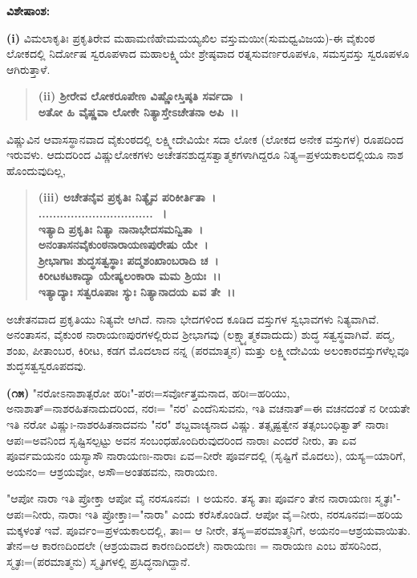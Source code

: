 \noindent
\textbf{ವಿಶೇಷಾಂಶ:\enginline{-}}

\textbf{(i)} ವಿಮಲಾಕೃತಿಃ ಪ್ರಕೃತಿರೇವ ಮಹಾಮಣಿಹೇಮಮಯ್ಯಖಿಲ ವಸ್ತುಮಯೀ\break (ಸುಮಧ್ವವಿಜಯ)-ಈ ವೈಕುಂಠ ಲೋಕದಲ್ಲಿ ನಿರ್ದೋಷ ಸ್ವರೂಪಳಾದ ಮಹಾಲಕ್ಷ್ಮಿಯೇ ಶ್ರೇಷ್ಠವಾದ ರತ್ನಸುವರ್ಣರೂಪಳೂ, ಸಮಸ್ತವಸ್ತು ಸ್ವರೂಪಳೂ ಆಗಿರುತ್ತಾಳೆ.

\begin{verse}
\textbf{(ii) ಶ‍್ರೀರೇವ ಲೋಕರೂಪೇಣ ವಿಷ್ಣೋಸ್ತಿಷ್ಠತಿ ಸರ್ವದಾ~।}\\\textbf{ಅತೋ ಹಿ ವೈಷ್ಣವಾ ಲೋಕೇ ನಿತ್ಯಾಸ್ತೇಽಚೇತನಾ ಅಪಿ~।।}
\end{verse}


ವಿಷ್ಣುವಿನ ಆವಾಸಸ್ಥಾನವಾದ ವೈಕುಂಠದಲ್ಲಿ ಲಕ್ಷ್ಮೀದೇವಿಯೇ ಸದಾ ಲೋಕ (ಲೋಕದ ಅನೇಕ ವಸ್ತುಗಳ) ರೂಪದಿಂದ ಇರುವಳು. ಆದುದರಿಂದ ವಿಷ್ಣುಲೋಕಗಳು ಅಚೇತನಶುದ್ದಸತ್ವಾತ್ಮಕಗಳಾಗಿದ್ದರೂ ನಿತ್ಯ=ಪ್ರಳಯಕಾಲದಲ್ಲಿಯೂ ನಾಶ ಹೊಂದುವುದಿಲ್ಲ,

\begin{verse}
\textbf{(iii) ಅಚೇತನೈವ ಪ್ರಕೃತಿಃ ನಿತ್ಯೈವ ಪರಿಕೀರ್ತಿತಾ~।}\\\textbf{................................~।}\\\textbf{ಇತ್ಯಾದಿ ಪ್ರಕೃತಿಃ ನಿತ್ಯಾ ನಾನಾಭೇದಸಮನ್ವಿತಾ~।}\\\textbf{ಅನಂತಾಸನವೈಕುಂಠನಾರಾಯಣಪುರೇಷು ಯೇ~।}\\\textbf{ಶ‍್ರೀಭಾಗಾಃ ಶುದ್ಧಸತ್ವಸ್ಥಾಃ ಪದ್ಮಶಂಖಾಂಬರಾದಿ ಚ~।}\\\textbf{ಕಿರೀಟಕಟಕಾದ್ಯಾ ಯೇಷ್ಯಲಂಕಾರಾ ಮಮ ಶ್ರಿಯಃ~।।}\\\textbf{ಇತ್ಯಾದ್ಯಾಃ ಸತ್ವರೂಪಾಃ ಸ್ಯುಃ ನಿತ್ಯಾನಾದಯ ಏವ ತೇ~।।}
\end{verse}


\noindent
ಅಚೇತನವಾದ ಪ್ರಕೃತಿಯು ನಿತ್ಯವೇ ಆಗಿದೆ. ನಾನಾ ಭೇದಗಳಿಂದ ಕೂಡಿದ ವಸ್ತುಗಳ ಸ್ವಭಾವಗಳು ನಿತ್ಯವಾಗಿವೆ. ಅನಂತಾಸನ, ವೈಕುಂಠ ನಾರಾಯಣಪುರಗಳಲ್ಲಿರುವ ಶ‍್ರೀಭಾಗವು (ಲಕ್ಷ್ಮ್ಯಾತ್ಮಕವಾದುದು) ಶುದ್ಧ ಸತ್ವಸ್ಥವಾಗಿವೆ. ಪದ್ಮ, ಶಂಖ, ಪೀತಾಂಬರ, ಕಿರೀಟ, ಕಡಗ ಮೊದಲಾದ ನನ್ನ (ಪರಮಾತ್ಮನ) ಮತ್ತು ಲಕ್ಷ್ಮೀದೇವಿಯ ಅಲಂಕಾರವಸ್ತುಗಳೆಲ್ಲವೂ ಶುದ್ಧಸತ್ವಸ್ವರೂಪದವು.

\textbf{(೧೫)} "ನರೋಽನಾಶಾತ್ಪರೋ ಹರಿಃ"-ಪರಃ=ಸರ್ವೋತ್ತಮನಾದ, ಹರಿಃ=ಹರಿಯು, ಅನಾಶಾತ್=ನಾಶರಹಿತನಾದುದರಿಂದ, ನರಃ= "ನರ' ಎಂದೆನಿಸುವನು, ಇತಿ ವಚನಾತ್=ಈ ವಚನದಂತೆ ನ ರೀಯತೇ ಇತಿ ನರೋ ವಿಷ್ಣುಃ-ನಾಶರಹಿತನಾದವನು "ನರ" ಶಬ್ದವಾಚ್ಯನಾದ ವಿಷ್ಣು. ತತ್ಸೃಷ್ಟತ್ವೇನ ತತ್ಸಂಬಂಧಿತ್ವಾತ್ ನಾರಾಃ ಆಪಃ=ಅವನಿಂದ ಸೃಷ್ಟಿಸಲ್ಪಟ್ಟು ಅವನ ಸಂಬಂಧಹೊಂದಿರುವುದರಿಂದ ನಾರಾಃ ಎಂದರೆ ನೀರು, ತಾ ಏವ ಪೂರ್ವಮಯನಂ ಯಸ್ಯಾಸೌ ನಾರಾಯಣಃ-ನಾರಾಃ ಏವ=ನೀರೇ ಪೂರ್ವದಲ್ಲಿ (ಸೃಷ್ಟಿಗೆ ಮೊದಲು), ಯಸ್ಯ=ಯಾರಿಗೆ, ಅಯನಂ= ಆಶ್ರಯವೋ, ಅಸೌ=ಅಂತಹವನು, ನಾರಾಯಣ.

"ಆಪೋ ನಾರಾ ಇತಿ ಪ್ರೋಕ್ತಾ ಆಪೋ ವೈ ನರಸೂನವಃ~। ಅಯನಂ. ತಸ್ಯ ತಾಃ ಪೂರ್ವಂ ತೇನ ನಾರಾಯಣಃ ಸ್ಮೃತಃ"-ಆಪಃ=ನೀರು, ನಾರಾಃ ಇತಿ ಪ್ರೋಕ್ತಾಃ="ನಾರಾ" ಎಂದು ಕರೆಸಿಕೊಂಡಿದೆ. ಆಪೋ ವೈ=ನೀರು, ನರಸೂನವಃ=ಹರಿಯ ಮಕ್ಕಳಂತೆ ಇವೆ. ಪೂರ್ವಂ=ಪ್ರಳಯಕಾಲದಲ್ಲಿ, ತಾಃ= ಆ ನೀರೇ, ತಸ್ಯ=ಪರಮಾತ್ಮನಿಗೆ, ಅಯನಂ=ಆಶ್ರಯ\-ವಾಯಿತು. ತೇನ=ಆ ಕಾರಣದಿಂದಲೇ (ಆಶ್ರಯವಾದ ಕಾರಣದಿಂದಲೇ) ನಾರಾಯಣಃ = ನಾರಾಯಣ ಎಂಬ ಹೆಸರಿನಿಂದ, ಸ್ಮೃತಃ=(ಪರಮಾತ್ಮನು) ಸ್ಮೃತಿಗಳಲ್ಲಿ ಪ್ರಸಿದ್ಧನಾಗಿದ್ದಾನೆ.

